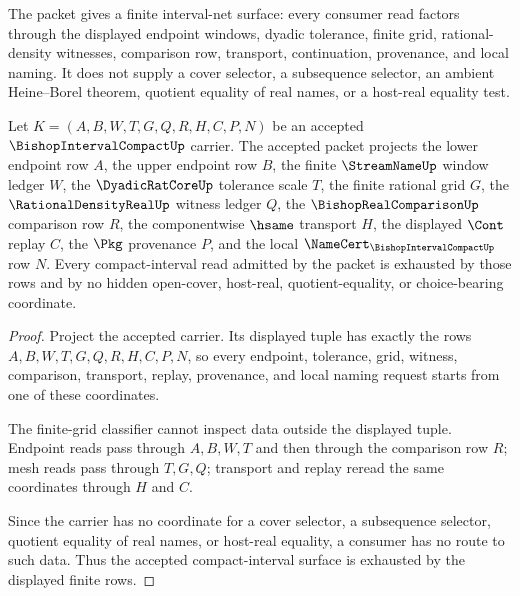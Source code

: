 The packet gives a finite interval-net surface: every consumer read factors through the displayed endpoint windows, dyadic tolerance, finite grid, rational-density witnesses, comparison row, transport, continuation, provenance, and local naming. It does not supply a cover selector, a subsequence selector, an ambient Heine--Borel theorem, quotient equality of real names, or a host-real equality test.

\begin{theorem}
\label{thm:bishop-interval-compact-finite-grid-obligation}
Let $K=(A,B,W,T,G,Q,R,H,C,P,N)$ be an accepted $\BishopIntervalCompactUp$ carrier. The accepted packet projects the lower endpoint row $A$, the upper endpoint row $B$, the finite $\StreamNameUp$ window ledger $W$, the $\DyadicRatCoreUp$ tolerance scale $T$, the finite rational grid $G$, the $\RationalDensityRealUp$ witness ledger $Q$, the $\BishopRealComparisonUp$ comparison row $R$, the componentwise $\hsame$ transport $H$, the displayed $\Cont$ replay $C$, the $\Pkg$ provenance $P$, and the local $\NameCert_{\BishopIntervalCompactUp}$ row $N$. Every compact-interval read admitted by the packet is exhausted by those rows and by no hidden open-cover, host-real, quotient-equality, or choice-bearing coordinate.
\end{theorem}
\begin{proof}
Project the accepted carrier. Its displayed tuple has exactly the rows $A,B,W,T,G,Q,R,H,C,P,N$, so every endpoint, tolerance, grid, witness, comparison, transport, replay, provenance, and local naming request starts from one of these coordinates.

The finite-grid classifier cannot inspect data outside the displayed tuple. Endpoint reads pass through $A,B,W,T$ and then through the comparison row $R$; mesh reads pass through $T,G,Q$; transport and replay reread the same coordinates through $H$ and $C$.

Since the carrier has no coordinate for a cover selector, a subsequence selector, quotient equality of real names, or host-real equality, a consumer has no route to such data. Thus the accepted compact-interval surface is exhausted by the displayed finite rows.
\end{proof}

